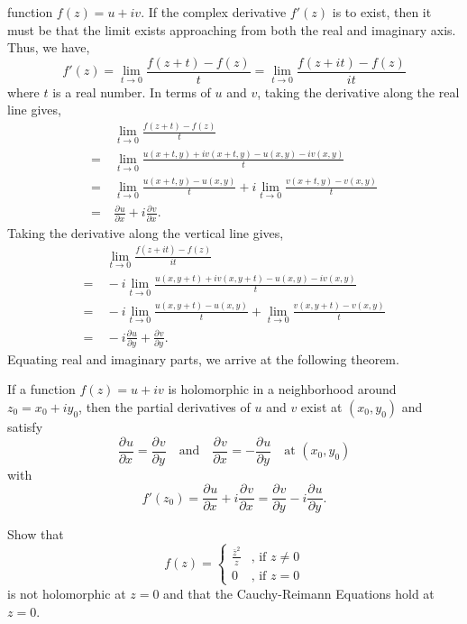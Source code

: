 \documentclass[11pt]{article}
\newcommand*{\pd}[3][]{\ensuremath{\frac{\partial^{#1} #2}{\partial #3^{#1}}}}
\begin{document}
function $f(z) = u + iv$. If the complex derivative $f'(z)$ is to exist, then it
must be that the limit exists approaching from both the real and imaginary
axis. Thus, we have,
\begin{equation*}
f'(z)  = \lim_{t\to 0} \frac{f(z+t) - f(z)}{t} = \lim_{t\to 0} \frac{f(z+it) -
f(z)}{it}
\end{equation*}
where $t$ is a real number. In terms of $u$ and $v$, taking the derivative along
the real line gives,
\begin{align*}
&\>\lim_{t\to 0} \frac{f(z+t) - f(z)}{t}\\
=&\> \lim_{t\to 0} \frac{u(x+t,y) + iv(x+t,y) - u(x,y) - iv(x,y)}{t}\\
=&\> \lim_{t\to 0} \frac{u(x+t,y) - u(x,y)}{t} + i\lim_{t\to 0} \frac{v(x+t,y) - 
v(x,y)}{t}\\
=&\> \pd{u}{x} + i \pd{v}{x}.
\end{align*}
Taking the derivative along the vertical line gives,
\begin{align*}
&\>\lim_{t\to 0} \frac{f(z+it) - f(z)}{it}\\
=&\> -i\lim_{t\to 0} \frac{u(x,y+t) + iv(x,y+t) - u(x,y) - iv(x,y)}{t}\\
=&\> -i\lim_{t\to 0} \frac{u(x,y+t) - u(x,y)}{t} + \lim_{t\to 0} \frac{v(x,y+t) - 
v(x,y)}{t}\\
=&\> -i\pd{u}{y} + \pd{v}{y}.
\end{align*}
Equating real and imaginary parts, we arrive at the following theorem.
\begin{theorem} \label{theorem1}
If a function $f(z) = u + iv$ is holomorphic in a neighborhood around $z_0 = x_0
+ iy_0$, then the partial derivatives of $u$ and $v$ exist at $(x_0,y_0)$ and satisfy
\begin{equation*}
\pd{u}{x} = \pd{v}{y} \quad \text{and} \quad \pd{v}{x} = - \pd{u}{y}\quad\text{at }
(x_0,y_0)
\end{equation*}
with
\begin{equation*}
f'(z_0) = \pd{u}{x} + i \pd{v}{x} = \pd{v}{y} - i\pd{u}{y}.
\end{equation*}
\end{theorem}
\begin{example}
Show that
\begin{equation*}
f(z) =
\begin{cases}
\frac{\bar z^2}{z} & \text{, if } z \neq 0\\
0 & \text{, if } z = 0
\end{cases}
\end{equation*}
is not holomorphic at $z = 0$ and that the Cauchy-Reimann Equations hold at
$z = 0$.
\end{example}
\end{document}

